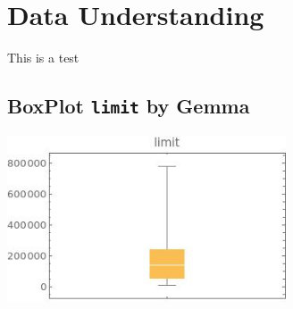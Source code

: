 \documentclass[a4paper]{article}
\begin{document}

\tableofcontents
\newpage




\section{Data Understanding}

This is a test

\subsection{BoxPlot {\tt limit} by Gemma}

\includegraphics[width=0.62\textwidth]{imgs/limit.jpeg}
\end{document}
